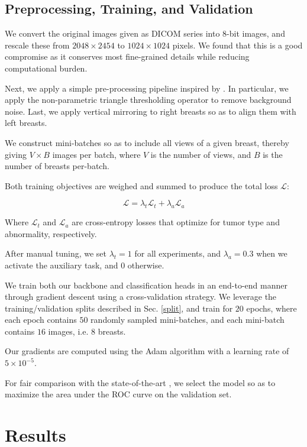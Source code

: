 \documentclass[11pt]{article}
\begin{document}
\subsection{Preprocessing, Training, and Validation}
\label{sec:org89494d1}

We convert the original images given as DICOM series into 8-bit images,
and rescale these from \(2048 \times 2454\) to \(1024 \times 1024\) pixels. We found that this
is a good compromise as it conserves most fine-grained details while
reducing computational burden.

Next, we apply a simple pre-processing pipeline inspired by \autocite{walsh22}.
In particular, we apply the non-parametric triangle thresholding operator \autocite{zack77}
to remove background noise.
Last, we apply vertical mirroring to right breasts so as to align them with left breasts.

We construct mini-batches so as to include all views of a given breast, thereby
giving \(V \times B\) images per batch, where \(V\) is the number of views,
and \(B\) is the number of breasts per-batch.

Both training objectives are weighed and summed to produce
the total loss \(\mathcal{L}\):

\begin{equation}
\mathcal{L} = \lambda_{t}\mathcal{L}_{t} + \lambda_{a}\mathcal{L}_{a}
\end{equation}

Where \(\mathcal{L}_t\) and \(\mathcal{L}_a\) are cross-entropy losses that optimize
for tumor type and abnormality, respectively.

After manual tuning, we set \(\lambda_t=1\) for all experiments,
and \(\lambda_a=0.3\) when we activate the auxiliary task, and \(0\) otherwise.

We train both our backbone and classification heads in an end-to-end manner through
gradient descent using a cross-validation strategy.
We leverage the training/validation splits described in Sec. \ref{split}, and train for
\(20\) epochs, where each epoch contains \(50\) randomly sampled mini-batches,
and each mini-batch contains \(16\) images, i.e. \(8\) breasts.

Our gradients are computed using the Adam algorithm with a learning rate of
\(5 \times 10^{-5}\).

For fair comparison with the state-of-the-art \autocite{walsh22}, we select the model so
as to maximize the area under the ROC curve on the validation set.
\section{Results}
\label{sec:org3edf7e4}
\end{document}
